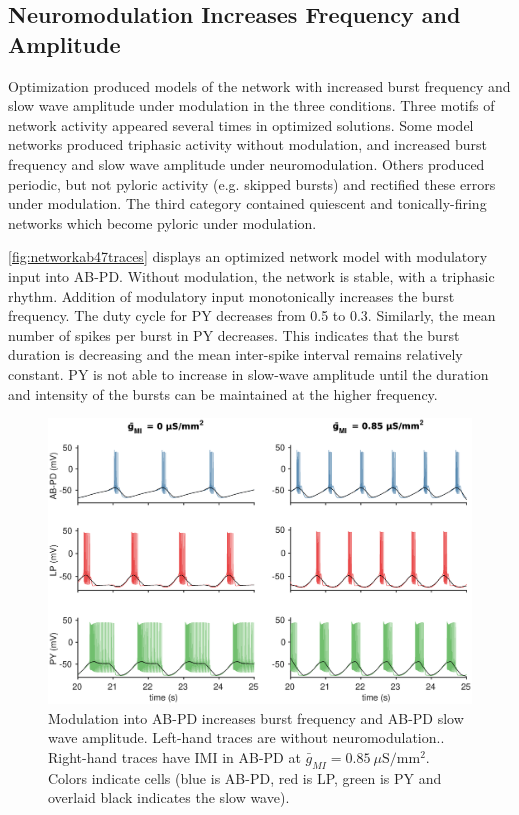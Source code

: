 \subsection{Neuromodulation Increases Frequency and Amplitude}
Optimization produced models of the network with increased burst frequency and slow wave amplitude under modulation in the three conditions. Three motifs of network activity appeared several times in optimized solutions. Some model networks produced triphasic activity without modulation, and increased burst frequency and slow wave amplitude under neuromodulation. Others produced periodic, but not pyloric activity (e.g. skipped bursts) and rectified these errors under modulation. The third category contained quiescent and tonically-firing networks which become pyloric under modulation.

\autoref{fig:networkab47traces} displays an optimized network model with modulatory input into \acs{AB}-\acs{PD}. Without modulation, the network is stable, with a triphasic rhythm. Addition of modulatory input monotonically increases the burst frequency. The duty cycle for \acs{PY} decreases from 0.5 to 0.3. Similarly, the mean number of spikes per burst in \acs{PY} decreases. This indicates that the burst duration is decreasing and the mean inter-spike interval remains relatively constant. \acs{PY} is not able to increase in slow-wave amplitude until the duration and intensity of the bursts can be maintained at the higher frequency. 

\begin{figure}[h]
	\centering
	\includegraphics[width=1.0\linewidth]{gfx/network/network_AB_47_traces}
	\caption[Network with modulation into AB-PD (traces)]{Modulation into \acs{AB}-\acs{PD} increases burst frequency and \acs{AB}-\acs{PD} slow wave amplitude. Left-hand traces are without neuromodulation.. Right-hand traces have \acs{IMI} in \acs{AB}-\acs{PD} at $\bar{g}_{MI} = 0.85~\mu \mathrm{S/mm^2}$. Colors indicate cells (blue is \acs{AB}-\acs{PD}, red is \acs{LP}, green is \acs{PY} and overlaid black indicates the slow wave).}
	\label{fig:networkab47traces}
\end{figure}

